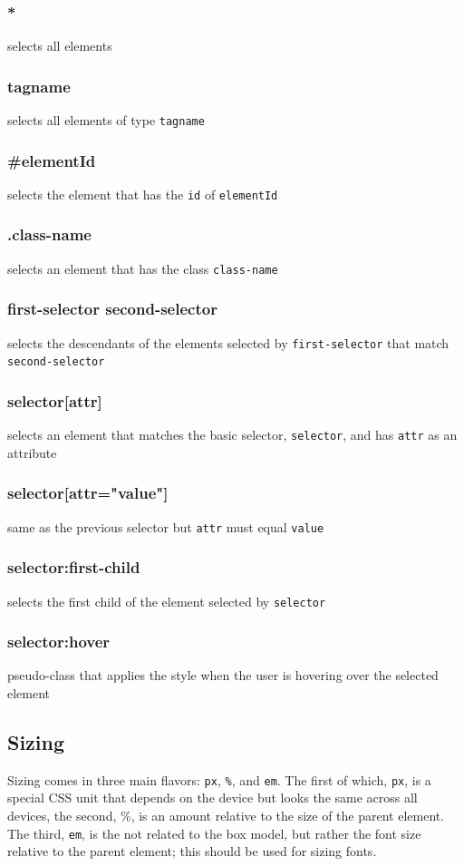 \documentclass[12pt]{article}
\begin{document}
\subsubsection*{*}
selects all elements
\subsubsection*{tagname}
selects all elements of type \texttt{tagname}
\subsubsection*{\#elementId}
selects the element that has the \texttt{id} of \texttt{elementId}
\subsubsection*{.class-name}
selects an element that has the class \texttt{class-name}
\subsubsection*{first-selector second-selector}
selects the descendants of the elements selected by \texttt{first-selector} that match \texttt{second-selector}
\subsubsection*{selector[attr]}
selects an element that matches the basic selector, \texttt{selector}, and has \texttt{attr} as an attribute
\subsubsection*{selector[attr="value"]}
same as the previous selector but \texttt{attr} must equal \texttt{value}
\subsubsection*{selector:first-child}
selects the first child of the element selected by \texttt{selector}
\subsubsection*{selector:hover}
pseudo-class that applies the style when the user is hovering over the selected element


\subsection{Sizing}
Sizing comes in three main flavors: \texttt{px}, \texttt{\%}, and \texttt{em}. The first of which, \texttt{px}, is a special CSS unit that depends on the device but looks the same across all devices, the second, \%, is an amount relative to the size of the parent element. The third, \texttt{em}, is the not related to the box model, but rather the font size relative to the parent element; this should be used for sizing fonts.
\end{document}
